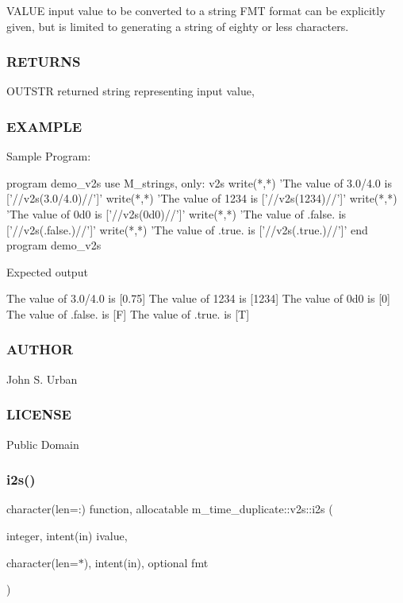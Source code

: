 V\+A\+L\+UE input value to be converted to a string F\+MT format can be explicitly given, but is limited to generating a string of eighty or less characters.

\subsubsection*{R\+E\+T\+U\+R\+NS}

O\+U\+T\+S\+TR returned string representing input value,

\subsubsection*{E\+X\+A\+M\+P\+LE}

\begin{DoxyVerb}Sample Program:

 program demo_v2s
 use M_strings, only: v2s
 write(*,*) 'The value of 3.0/4.0 is ['//v2s(3.0/4.0)//']'
 write(*,*) 'The value of 1234    is ['//v2s(1234)//']'
 write(*,*) 'The value of 0d0     is ['//v2s(0d0)//']'
 write(*,*) 'The value of .false. is ['//v2s(.false.)//']'
 write(*,*) 'The value of .true. is  ['//v2s(.true.)//']'
 end program demo_v2s

Expected output

 The value of 3.0/4.0 is [0.75]
 The value of 1234    is [1234]
 The value of 0d0     is [0]
 The value of .false. is [F]
 The value of .true. is  [T]
\end{DoxyVerb}


\subsubsection*{A\+U\+T\+H\+OR}

John S. Urban \subsubsection*{L\+I\+C\+E\+N\+SE}

Public Domain \mbox{\label{interfacem__time__duplicate_1_1v2s_a753dd0a1757b4090937356a377849b13}} 
\subsubsection{\texorpdfstring{i2s()}{i2s()}}
{\footnotesize\ttfamily character(len=\+:) function, allocatable m\+\_\+time\+\_\+duplicate\+::v2s\+::i2s (\begin{DoxyParamCaption}\item[{integer, intent(in)}]{ivalue,  }\item[{character(len=$\ast$), intent(in), optional}]{fmt }\end{DoxyParamCaption})}

